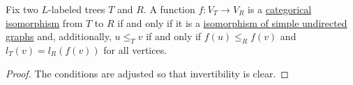 \begin{proposition}\label{thm:labeled_tree_isomorphisms}
  Fix two \( L \)-labeled trees \( T \) and \( R \). A function \( f: V_T \to V_R \) is a \hyperref[def:morphism_invertibility/isomorphism]{categorical isomorphism} from \( T \) to \( R \) if and only if it is a \hyperref[thm:graph_isomorphisms/simple_undirected]{isomorphism of simple undirected graphs} and, additionally, \( u \leq_T v \) if and only if \( f(u) \leq_R f(v) \) and \( l_T(v) = l_R(f(v)) \) for all vertices.
\end{proposition}
\begin{proof}
  The conditions are adjusted so that invertibility is clear.
\end{proof}
